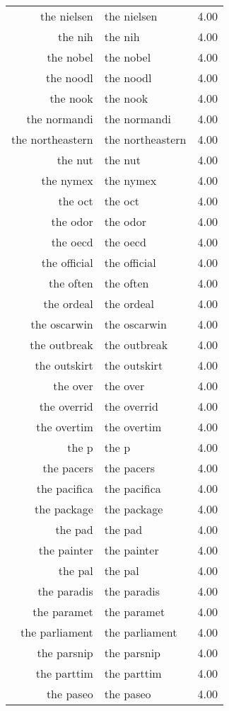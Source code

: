 \begin{table}[ht]
\begin{tabular}{rlr}
  the nielsen & the nielsen & 4.00 \\ 
  the nih & the nih & 4.00 \\ 
  the nobel & the nobel & 4.00 \\ 
  the noodl & the noodl & 4.00 \\ 
  the nook & the nook & 4.00 \\ 
  the normandi & the normandi & 4.00 \\ 
  the northeastern & the northeastern & 4.00 \\ 
  the nut & the nut & 4.00 \\ 
  the nymex & the nymex & 4.00 \\ 
  the oct & the oct & 4.00 \\ 
  the odor & the odor & 4.00 \\ 
  the oecd & the oecd & 4.00 \\ 
  the official & the official & 4.00 \\ 
  the often & the often & 4.00 \\ 
  the ordeal & the ordeal & 4.00 \\ 
  the oscarwin & the oscarwin & 4.00 \\ 
  the outbreak & the outbreak & 4.00 \\ 
  the outskirt & the outskirt & 4.00 \\ 
  the over & the over & 4.00 \\ 
  the overrid & the overrid & 4.00 \\ 
  the overtim & the overtim & 4.00 \\ 
  the p & the p & 4.00 \\ 
  the pacers & the pacers & 4.00 \\ 
  the pacifica & the pacifica & 4.00 \\ 
  the package & the package & 4.00 \\ 
  the pad & the pad & 4.00 \\ 
  the painter & the painter & 4.00 \\ 
  the pal & the pal & 4.00 \\ 
  the paradis & the paradis & 4.00 \\ 
  the paramet & the paramet & 4.00 \\ 
  the parliament & the parliament & 4.00 \\ 
  the parsnip & the parsnip & 4.00 \\ 
  the parttim & the parttim & 4.00 \\ 
  the paseo & the paseo & 4.00 \\ 

\end{tabular}
\end{table}
